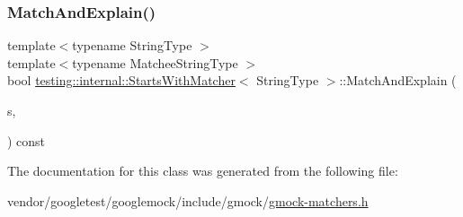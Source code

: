 \subsubsection{\texorpdfstring{Match\+And\+Explain()}{MatchAndExplain()}\hspace{0.1cm}{\footnotesize\ttfamily [2/2]}}
{\footnotesize\ttfamily template$<$typename String\+Type $>$ \\
template$<$typename Matchee\+String\+Type $>$ \\
bool \hyperlink{classtesting_1_1internal_1_1_starts_with_matcher}{testing\+::internal\+::\+Starts\+With\+Matcher}$<$ String\+Type $>$\+::Match\+And\+Explain (\begin{DoxyParamCaption}\item[{const Matchee\+String\+Type \&}]{s,  }\item[{\hyperlink{classtesting_1_1_match_result_listener}{Match\+Result\+Listener} $\ast$}]{ }\end{DoxyParamCaption}) const\hspace{0.3cm}{\ttfamily [inline]}}



The documentation for this class was generated from the following file\+:\begin{DoxyCompactItemize}
\item 
vendor/googletest/googlemock/include/gmock/\hyperlink{gmock-matchers_8h}{gmock-\/matchers.\+h}\end{DoxyCompactItemize}
